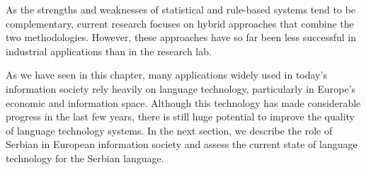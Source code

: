 \begin{multicols}{2}
As the strengths and weaknesses of statistical and rule-based systems tend to be complementary, current research focuses on hybrid approaches that combine the two methodologies. However, these approaches have so far been less successful in industrial applications than in the research lab. 

As we have seen in this chapter, many applications widely used in today’s information society rely heavily on language technology, particularly in Europe’s economic and information space. Although this technology has made considerable progress in the last few years, there is still huge potential to improve the quality of language technology systems. In the next section, we describe the role of Serbian in European information society and assess the current state of language technology for the Serbian language. 

\end{multicols}

\clearpage


